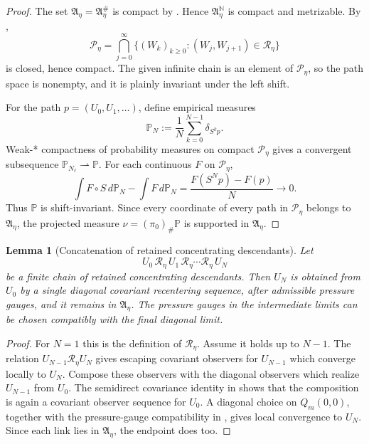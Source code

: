 \documentclass[11pt]{amsart}
\numberwithin{equation}{section}
\theoremstyle{plain}
\newtheorem{lemma}[lemma]{Lemma}
\theoremstyle{definition}
\theoremstyle{remark}
\begin{document}
\begin{proof}
The set \(\mathfrak A_\eta=\mathfrak A_\eta^\#\) is compact by
.  Hence
\(\mathfrak A_\eta^{\mathbb N}\) is compact and metrizable.  By
,
\[
   \mathscr P_\eta
   =
   \bigcap_{j=0}^\infty
   \{(W_k)_{k\ge0}:(W_j,W_{j+1})\in\mathcal R_\eta\}
\]
is closed, hence compact.  The given infinite chain is an element of
\(\mathscr P_\eta\), so the path space is nonempty, and it is plainly invariant
under the left shift.

For the path \(p=(U_0,U_1,\ldots)\), define empirical measures
\[
   \mathbb P_N:=\frac1N\sum_{k=0}^{N-1}\delta_{S^kp}.
\]
Weak-* compactness of probability measures on compact \(\mathscr P_\eta\) gives
a convergent subsequence \(\mathbb P_{N_\ell}\rightharpoonup\mathbb P\).  For
each continuous \(F\) on \(\mathscr P_\eta\),
\[
   \int F\circ S\,d\mathbb P_N-\int F\,d\mathbb P_N
   =
   \frac{F(S^Np)-F(p)}{N}\to0.
\]
Thus \(\mathbb P\) is shift-invariant.  Since every coordinate of every path in
\(\mathscr P_\eta\) belongs to \(\mathfrak A_\eta\), the projected measure
\(\nu=(\pi_0)_\#\mathbb P\) is supported in \(\mathfrak A_\eta\).
\end{proof}

\begin{lemma}[Concatenation of retained concentrating descendants]
\label{lem:active-descendant-concatenation}
Let
\[
   U_0\,\mathcal R_\eta\,U_1\,\mathcal R_\eta\cdots
   \mathcal R_\eta\,U_N
\]
be a finite chain of retained concentrating descendants.  Then \(U_N\) is obtained from \(U_0\) by a
single diagonal covariant recentering sequence, after admissible pressure
gauges, and it remains in \(\mathfrak A_\eta\).  The pressure gauges in the
intermediate limits can be chosen compatibly with the final diagonal limit.
\end{lemma}

\begin{proof}
For \(N=1\) this is the definition of \(\mathcal R_\eta\).  Assume it holds up
to \(N-1\).  The relation \(U_{N-1}\mathcal R_\eta U_N\) gives escaping
covariant observers for \(U_{N-1}\) which converge locally to \(U_N\).  Compose
these observers with the diagonal observers which realize \(U_{N-1}\) from
\(U_0\).  The semidirect covariance identity in
 shows that the composition is again a
covariant observer sequence for \(U_0\).  A diagonal choice on \(Q_m(0,0)\),
together with the pressure-gauge compatibility in
, gives local convergence to \(U_N\).  Since each
link lies in \(\mathfrak A_\eta\), the endpoint does too.
\end{proof}
\end{document}
